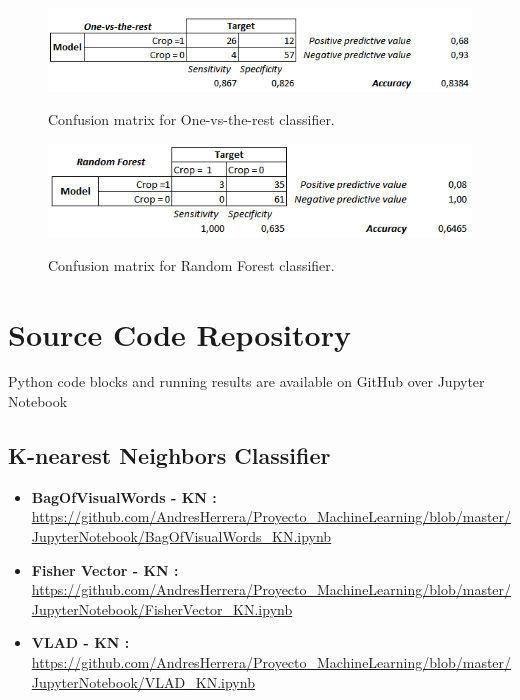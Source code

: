 \documentclass[12pt]{article}
\numberwithin{equation}{section}
\numberwithin{table}{section}
\numberwithin{figure}{section}
\begin{document}
\begin{figure}[H] \centering
	\caption{Confusion matrix for One-vs-the-rest classifier. }
	\includegraphics[width=1\textwidth]{m4.png}
	\label{m4}
\end{figure}

\begin{figure}[H] \centering
	\caption{Confusion matrix for Random Forest classifier. }
	\includegraphics[width=1\textwidth]{m5.png}
	\label{m5}
\end{figure}





\section{Source Code Repository}

Python code blocks and running results are available on GitHub over Jupyter Notebook

\subsection{K-nearest Neighbors Classifier }

\begin{itemize}
	\item {\textbf{BagOfVisualWords - KN :} } \url{https://github.com/AndresHerrera/Proyecto_MachineLearning/blob/master/JupyterNotebook/BagOfVisualWords_KN.ipynb}
	
	\item {\textbf{Fisher Vector - KN :} } \url{	https://github.com/AndresHerrera/Proyecto_MachineLearning/blob/master/JupyterNotebook/FisherVector_KN.ipynb}
	
	\item {\textbf{VLAD - KN :} } \url{	https://github.com/AndresHerrera/Proyecto_MachineLearning/blob/master/JupyterNotebook/VLAD_KN.ipynb}
		
\end{itemize}
\end{document}
